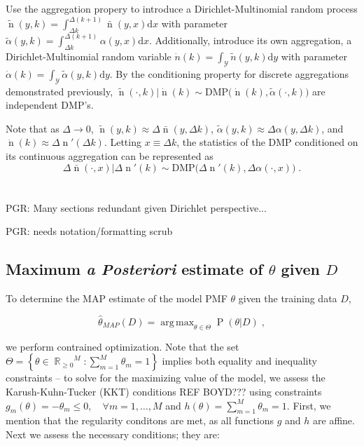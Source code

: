 \documentclass[12pt]{report}
\DeclareMathOperator*{\argmax}{arg\,max}
\DeclareMathOperator{\nrm}{\mathrm{n}}
\DeclareMathOperator{\Prm}{\mathrm{P}}
\DeclareMathOperator{\Ycal}{\mathcal{Y}}
\DeclareMathOperator{\Rbb}{\mathbb{R}}
\begin{document}
Use the aggregation propery to introduce a Dirichlet-Multinomial random process $\tilde{\nrm}(y,k) = \int_{\Delta k}^{\Delta (k+1)} \bar{\nrm}(y,x) \mathrm{d}x$ with parameter $\tilde{\alpha}(y,k) = \int_{\Delta k}^{\Delta (k+1)} \alpha(y,x) \mathrm{d}x$. Additionally, introduce its own aggregation, a Dirichlet-Multinomial random variable $\dot{n}(k) = \int_{\Ycal} \tilde{n}(y,k) \mathrm{d}y$ with parameter $\dot{\alpha}(k) = \int_{\Ycal} \tilde{\alpha}(y,k) \mathrm{d}y$. By the conditioning property for discrete aggregations demonstrated previously, $\tilde{\nrm}(\cdot,k) | \dot{\nrm}(k) \sim \mathrm{DMP}\big( \dot{\nrm}(k),\tilde{\alpha}(\cdot,k) \big)$ are independent DMP's.

Note that as $\Delta \to 0$, $\tilde{\nrm}(y,k) \approx \Delta \bar{\nrm}(y,\Delta k)$, $\tilde{\alpha}(y,k) \approx \Delta \alpha(y,\Delta k)$, and $\dot{\nrm}(k) \approx \Delta \nrm'(\Delta k)$. Letting $x \equiv \Delta k$, the statistics of the DMP conditioned on its continuous aggregation can be represented as
\begin{equation}
\Delta \bar{\nrm}(\cdot,x) | \Delta \nrm'(k) \sim \mathrm{DMP}\big( \Delta \nrm'(k), \Delta \alpha(\cdot,x) \big) \;.
\end{equation}







\chapter{}


PGR: Many sections redundant given Dirichlet perspective...

PGR: needs notation/formatting scrub






\section{Maximum \emph{a Posteriori} estimate of $\theta$ given $D$} \label{app:MAP_theta}

To determine the MAP estimate of the model PMF $\theta$ given the training data $D$, 

\begin{equation}
\hat{\theta}_{MAP}(D) = \argmax_{\theta \in \Theta} \Prm(\theta | D) \;,
\end{equation}

we perform contrained optimization. Note that the set $\Theta = \left\{ \theta \in {\Rbb_{\geq 0}}^{M}: \sum_{m=1}^{M} \theta_m = 1 \right\}$ implies both equality and inequality constraints -- to solve for the maximizing value of the model, we assess the Karush-Kuhn-Tucker (KKT) conditions REF BOYD??? using constraints $g_m(\theta) = -\theta_m \leq 0, \quad \forall m = 1,\ldots,M$ and $h(\theta) = \sum_{m=1}^M \theta_m = 1$. First, we mention that the regularity conditons are met, as all functions $g$ and $h$ are affine. Next we assess the necessary conditions; they are:
\end{document}
